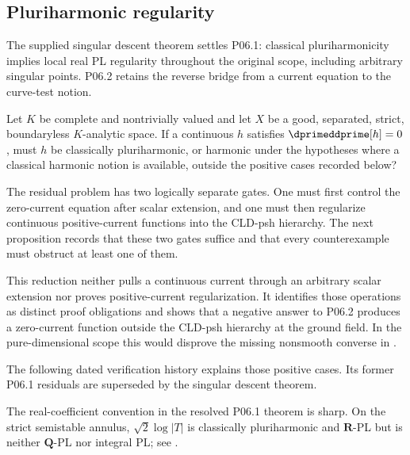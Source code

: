\subsection{Pluriharmonic regularity}
\label{sec:ch72-pluriharmonic}

The supplied singular descent theorem
 settles P06.1: classical
pluriharmonicity implies local real PL regularity throughout the original
scope, including arbitrary singular points. P06.2 retains the reverse
bridge from a current equation to the curve-test notion.

\begin{problem}\label{prob:frontier-pluriharmonic}
Let $K$ be complete and nontrivially valued and let $X$ be a good,
separated, strict, boundaryless $K$-analytic space. If a continuous $h$
satisfies $\dprimeddprime[h]=0$, must $h$ be classically pluriharmonic,
or harmonic under the hypotheses where a classical harmonic notion is
available, outside the positive cases recorded below?
\end{problem}

The residual problem has two logically separate gates.  One must first
control the zero-current equation after scalar extension, and one must then
regularize continuous positive-current functions into the CLD-psh
hierarchy.  The next proposition records that these two gates suffice and
that every counterexample must obstruct at least one of them.

\medskip



This reduction neither pulls a continuous current through an arbitrary
scalar extension nor proves positive-current regularization.  It identifies
those operations as distinct proof obligations and shows that a negative
answer to P06.2 produces a zero-current function outside the CLD-psh
hierarchy at the ground field.  In the pure-dimensional scope this would
disprove the missing nonsmooth converse in
.

The following dated verification history explains those positive cases.
Its former P06.1 residuals are superseded by the singular descent theorem.


The real-coefficient convention in the resolved P06.1 theorem is sharp.  On the strict
semistable annulus, \(\sqrt2\log|T|\) is classically pluriharmonic and
\(\mathbf R\)-PL but is neither \(\mathbf Q\)-PL nor integral PL; see
.

